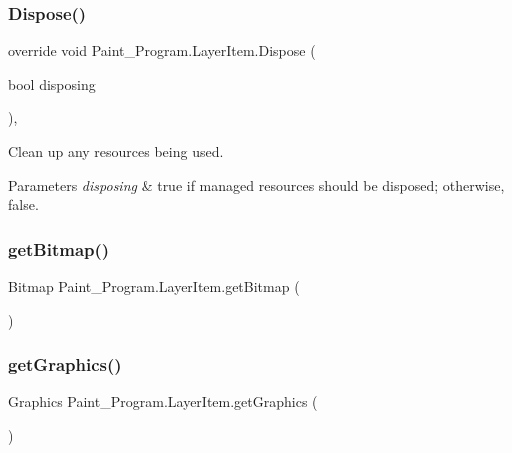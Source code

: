 \subsubsection{\texorpdfstring{Dispose()}{Dispose()}}
{\footnotesize\ttfamily override void Paint\+\_\+\+Program.\+Layer\+Item.\+Dispose (\begin{DoxyParamCaption}\item[{bool}]{disposing }\end{DoxyParamCaption})\hspace{0.3cm}{\ttfamily [inline]}, {\ttfamily [protected]}}



Clean up any resources being used. 


\begin{DoxyParams}{Parameters}
{\em disposing} & true if managed resources should be disposed; otherwise, false.\\
\hline
\end{DoxyParams}
\mbox{\label{class_paint___program_1_1_layer_item_a3055f80c0799ba9d800513881b866f56}} 
\subsubsection{\texorpdfstring{get\+Bitmap()}{getBitmap()}}
{\footnotesize\ttfamily Bitmap Paint\+\_\+\+Program.\+Layer\+Item.\+get\+Bitmap (\begin{DoxyParamCaption}{ }\end{DoxyParamCaption})\hspace{0.3cm}{\ttfamily [inline]}}

\mbox{\label{class_paint___program_1_1_layer_item_aaaa8ad207673d7db20deb9a084b2a3e3}} 
\subsubsection{\texorpdfstring{get\+Graphics()}{getGraphics()}}
{\footnotesize\ttfamily Graphics Paint\+\_\+\+Program.\+Layer\+Item.\+get\+Graphics (\begin{DoxyParamCaption}{ }\end{DoxyParamCaption})\hspace{0.3cm}{\ttfamily [inline]}}

